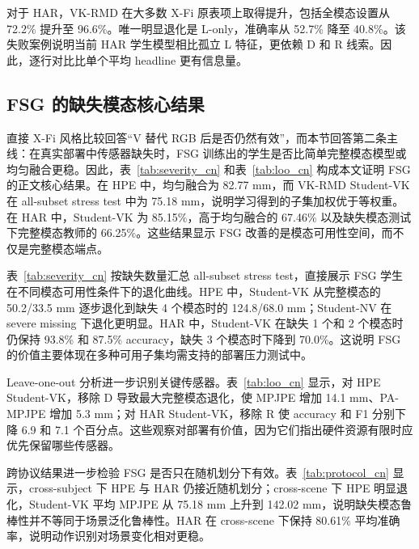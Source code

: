 ﻿\documentclass[UTF8,twocolumn]{ctexart}
\newcommand{\method}{VK-RMD}
\newcommand{\mpjpe}{MPJPE}
\newcommand{\pampjpe}{PA-MPJPE}
\begin{document}


对于 HAR，\method{} 在大多数 X-Fi 原表项上取得提升，包括全模态设置从 72.2\% 提升至 96.6\%。唯一明显退化是 L-only，准确率从 52.7\% 降至 40.8\%。该失败案例说明当前 HAR 学生模型相比孤立 L 特征，更依赖 D 和 R 线索。因此，逐行对比比单个平均 headline 更有信息量。

\clearpage
\twocolumn
\subsection{FSG 的缺失模态核心结果}
直接 X-Fi 风格比较回答“V 替代 RGB 后是否仍然有效”，而本节回答第二条主线：在真实部署中传感器缺失时，FSG 训练出的学生是否比简单完整模态模型或均匀融合更稳。因此，表~\ref{tab:severity_cn} 和表~\ref{tab:loo_cn} 构成本文证明 FSG 的正文核心结果。在 HPE 中，均匀融合为 82.77 mm，而 \method{} Student-VK 在 all-subset stress test 中为 75.18 mm，说明学习得到的子集加权优于等权重。在 HAR 中，Student-VK 为 85.15\%，高于均匀融合的 67.46\% 以及缺失模态测试下完整模态教师的 66.25\%。这些结果显示 FSG 改善的是模态可用性空间，而不仅是完整模态端点。

表~\ref{tab:severity_cn} 按缺失数量汇总 all-subset stress test，直接展示 FSG 学生在不同模态可用性条件下的退化曲线。HPE 中，Student-VK 从完整模态的 50.2/33.5 mm 逐步退化到缺失 4 个模态时的 124.8/68.0 mm；Student-NV 在 severe missing 下退化更明显。HAR 中，Student-VK 在缺失 1 个和 2 个模态时仍保持 93.8\% 和 87.5\% accuracy，缺失 3 个模态时下降到 70.0\%。这说明 FSG 的价值主要体现在多种可用子集均需支持的部署压力测试中。



Leave-one-out 分析进一步识别关键传感器。表~\ref{tab:loo_cn} 显示，对 HPE Student-VK，移除 D 导致最大完整模态退化，使 \mpjpe{} 增加 14.1 mm、\pampjpe{} 增加 5.3 mm；对 HAR Student-VK，移除 R 使 accuracy 和 F1 分别下降 6.9 和 7.1 个百分点。这些观察对部署有价值，因为它们指出硬件资源有限时应优先保留哪些传感器。



跨协议结果进一步检验 FSG 是否只在随机划分下有效。表~\ref{tab:protocol_cn} 显示，cross-subject 下 HPE 与 HAR 仍接近随机划分；cross-scene 下 HPE 明显退化，Student-VK 平均 \mpjpe{} 从 75.18 mm 上升到 142.02 mm，说明缺失模态鲁棒性并不等同于场景泛化鲁棒性。HAR 在 cross-scene 下保持 80.61\% 平均准确率，说明动作识别对场景变化相对更稳。


\end{document}
